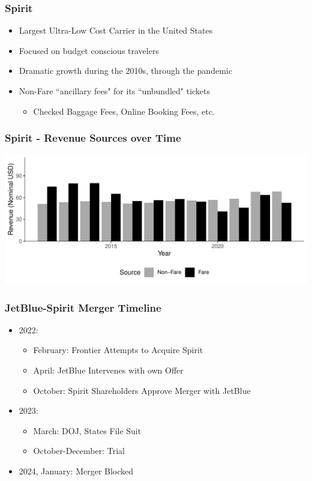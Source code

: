\documentclass[xcolor=dvipsnames]{beamer}
\begin{document}
    \begin{frame}
        \frametitle{Spirit}
        \begin{itemize}
            \item Largest Ultra-Low Cost Carrier in the United States
            \item Focused on budget conscious travelers
            \item Dramatic growth during the 2010s, through the pandemic
            \item Non-Fare ``ancillary fees" for its ``unbundled" tickets
            \begin{itemize}
                \item Checked Baggage Fees, Online Booking Fees, etc.
            \end{itemize}
        \end{itemize}
    \end{frame}

    \begin{frame}
     \frametitle{Spirit - Revenue Sources over Time}
        \includegraphics[width = \linewidth]{05.Figures/Spirit_Revenue_Sources.pdf}
    \end{frame}

    \begin{frame}
        \frametitle{JetBlue-Spirit Merger Timeline}
        \begin{itemize}
        \item 2022:
        \begin{itemize}
            \item February: Frontier Attempts to Acquire Spirit
            \item April: JetBlue Intervenes with own Offer
            \item October: Spirit Shareholders Approve Merger with JetBlue
        \end{itemize}
        \item 2023: 
        \begin{itemize}
            \item March: DOJ, States File Suit
            \item October-December: Trial
        \end{itemize}
        \item 2024, January: Merger Blocked
        \end{itemize}
    \end{frame}
\end{document}

